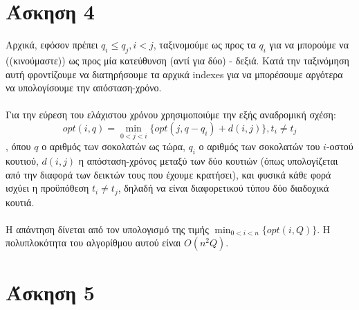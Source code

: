 \documentclass[12pt,a4paper]{article}
\begin{document}
  \section{Άσκηση 4}

    Αρχικά, εφόσον πρέπει \( q_i \le q_j, i < j \), ταξινομούμε ως προς τα \(
    q_i \) για να μπορούμε να ((κινούμαστε)) ως προς μία κατεύθυνση (αντί για
    δύο) - δεξιά. Κατά την ταξινόμηση αυτή φροντίζουμε να διατηρήσουμε τα
    αρχικά {\latintext indexes} για να μπορέσουμε αργότερα να υπολογίσουμε 
    την απόσταση-χρόνο.\\
    \\
    Για την εύρεση του ελάχιστου χρόνου χρησιμοποιύμε την εξής αναδρομική σχέση:
    \[ opt(i, q) = \min_{0 < j < i}\{ opt(j, q - q_i) + d(i, j) \}, t_i \neq t_j 
    \]
    , όπου \( q \) ο αριθμός των σοκολατών ως τώρα, \( q_i \) ο αριθμός των 
    σοκολατών του \( i \)-οστού κουτιού, \( d(i, j) \) η απόσταση-χρόνος μεταξύ
    των δύο κουτιών (όπως υπολογίζεται από την διαφορά των δεικτών τους που
    έχουμε κρατήσει), και φυσικά  κάθε φορά ισχύει η προϋπόθεση \(t_i \neq
    t_j \), δηλαδή να είναι διαφορετικού τύπου δύο διαδοχικά κουτιά. \\
    \\
    Η απάντηση δίνεται από τον υπολογισμό της τιμής \( \min_{0 < i < n}\{ opt(
    i, Q) \} \). Η πολυπλοκότητα του αλγορίθμου αυτού είναι \( O(n^2Q) \).
  
  \section{Άσκηση 5}
\end{document}
